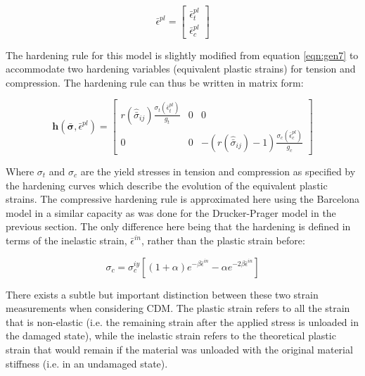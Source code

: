 \begin{equation}
\bar{\epsilon}^{pl}=
\left[
\begin{array}{c}
    \bar{\epsilon}_{t}^{pl}\\
    \bar{\epsilon}_{c}^{pl}
\end{array}
\right]
\label{eqn:const9}
\end{equation}

The hardening rule for this model is slightly modified from equation \ref{eqn:gen7} to accommodate two hardening variables (equivalent plastic strains) for tension and compression. The hardening rule can thus be written in matrix form:

\begin{equation}
\mathbf{h}\left(\bar{\boldsymbol{\sigma}},\bar{\epsilon}^{pl}\right)=\left[\begin{array}{ccc}
r\left(\hat{\bar{\sigma}}_{ij}\right)\frac{\sigma_t\left(\bar{\epsilon}_{t}^{pl}\right)}{g_t} & 0 & 0\\
0 & 0 & -\left(r\left(\hat{\bar{\sigma}}_{ij}\right)-1\right)\frac{\sigma_c\left(\bar{\epsilon}_{c}^{pl}\right)}{g_c}
\end{array}\right]\label{eqn:const9-1}
\end{equation}

Where $\sigma_t$ and $\sigma_c$ are the yield stresses in tension and compression as specified by the hardening curves which describe the evolution of the equivalent plastic strains. The compressive hardening rule is approximated here using the Barcelona model in a similar capacity as was done for the Drucker-Prager model in the previous section. The only difference here being that the hardening is defined in terms of the inelastic strain, $\bar{\epsilon}^{in}$, rather than the plastic strain before: 

\begin{equation}
\sigma_c=\sigma_c^{iy}\left [ \left ( 1+\alpha \right ) e^{-\beta\bar{\epsilon}^{in}}-\alpha e^{-2\beta\bar{\epsilon}^{in}}  \right ]
\label{eqn:dam1b}
\end{equation}

There exists a subtle but important distinction between these two strain measurements when considering CDM. The plastic strain refers to all the strain that is non-elastic (i.e. the remaining strain after the applied stress is unloaded in the damaged state), while the inelastic strain refers to the theoretical plastic strain that would remain if the material was unloaded with the original material stiffness (i.e. in an undamaged state).

